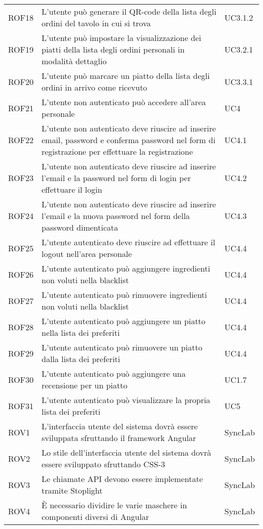 \begin{center}
\begin{longtable}{ |p{1.5cm}|p{9cm}|p{1.5cm}|  }
        ROF18&L'utente può generare il QR-code della lista degli ordini del tavolo in cui si trova &UC3.1.2 \\
        ROF19&L'utente può impostare la visualizzazione dei piatti della lista degli ordini personali in modalità dettaglio&UC3.2.1 \\
        ROF20&L'utente può marcare un piatto della lista degli ordini in arrivo come ricevuto&UC3.3.1 \\
        ROF21&L'utente non autenticato può accedere all'area personale&UC4\\
        ROF22&L'utente non autenticato deve riuscire ad inserire email, password e conferma password nel form di registrazione per effettuare la registrazione &UC4.1\\
        ROF23&L'utente non autenticato deve riuscire ad inserire l'email e la password nel form di login per effettuare il login &UC4.2\\
        ROF24&L'utente non autenticato deve riuscire ad inserire l'email e la nuova password nel form della password dimenticata&UC4.3\\
        ROF25&L'utente autenticato deve riuscire ad effettuare il logout nell'area personale&UC4.4\\
        ROF26&L'utente autenticato può aggiungere ingredienti non voluti nella blacklist&UC4.4\\
        ROF27&L'utente autenticato può rimuovere ingredienti non voluti nella blacklist&UC4.4\\
        ROF28&L'utente autenticato può aggiungere un piatto nella lista dei preferiti&UC4.4\\
        ROF29&L'utente autenticato può rimuovere un piatto dalla lista dei preferiti&UC4.4\\
        ROF30&L'utente autenticato può aggiungere una recensione per un piatto&UC1.7\\
        ROF31&L'utente autenticato può visualizzare la propria lista dei preferiti&UC5\\
        ROV1&L'interfaccia utente del sistema dovrà essere sviluppata sfruttando il framework Angular&SyncLab\\
        ROV2&Lo stile dell'interfaccia utente del sistema dovrà essere sviluppato sfruttando CSS-3&SyncLab\\
        ROV3&Le chiamate API devono essere implementate tramite Stoplight&SyncLab\\
        ROV4&È necessario dividire le varie maschere in componenti diversi di Angular&SyncLab\\

\end{longtable}
\end{center}
